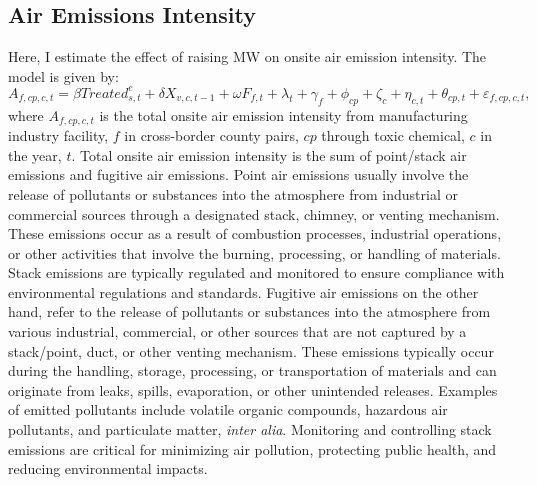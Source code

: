 \documentclass[12pt, english]{article}
\begin{document}
    \subsection{Air Emissions Intensity}\label{subsec:air-emission-intensity}
    Here, I estimate the effect of raising MW on onsite air emission intensity. The model is given by:
    \begin{equation}
        A_{f,cp,c,t} = \beta Treated_{s,t}^e + \delta X_{v,c,t-1} + \omega F_{f,t} + \lambda_{t} + \gamma_{f} + \phi_{cp} + \zeta_{c} + \eta_{c,t} + \theta_{cp,t} + \varepsilon_{f,cp,c,t},\label{eq:baseline-onsite-air-emission-intensity}
    \end{equation}
    where $A_{f,cp,c,t}$ is the total onsite air emission intensity from manufacturing industry facility, $f$ in cross-border county pairs, $cp$ through toxic chemical, $c$ in the year, $t$. Total onsite air emission intensity is the sum of point/stack air emissions and fugitive air emissions. Point air emissions usually involve the release of pollutants or substances into the atmosphere from industrial or commercial sources through a designated stack, chimney, or venting mechanism. These emissions occur as a result of combustion processes, industrial operations, or other activities that involve the burning, processing, or handling of materials. Stack emissions are typically regulated and monitored to ensure compliance with environmental regulations and standards. Fugitive air emissions on the other hand, refer to the release of pollutants or substances into the atmosphere from various industrial, commercial, or other sources that are not captured by a stack/point, duct, or other venting mechanism. These emissions typically occur during the handling, storage, processing, or transportation of materials and can originate from leaks, spills, evaporation, or other unintended releases. Examples of emitted pollutants include volatile organic compounds, hazardous air pollutants, and particulate matter, \textit{inter alia}. Monitoring and controlling stack emissions are critical for minimizing air pollution, protecting public health, and reducing environmental impacts.
    
\end{document}
